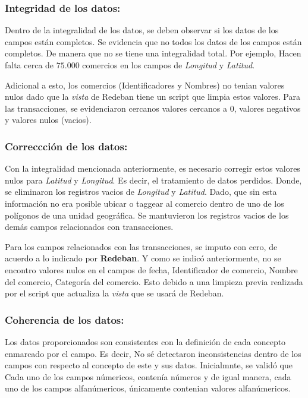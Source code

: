 \documentclass[a4paper]{article}
\begin{document}
\subsubsection*{Integridad de los datos:}

Dentro de la integralidad de los datos, se deben observar si los datos de los campos
están completos. Se evidencia que no todos los datos de los campos están completos.
De manera que no se tiene una integralidad total. Por ejemplo, Hacen falta cerca de $75.000$ comercios en los campos de \textit{Longitud} y \textit{Latitud}.

Adicional a esto, los comercios (Identificadores y Nombres) no tenian valores nulos
dado que la \textit{vista} de Redeban tiene un script que limpia estos valores. Para las transacciones,
se evidenciaron cercanos valores cercanos a 0, valores negativos y valores nulos (vacios).

\subsubsection*{Correccción de los datos:}

Con la integralidad mencionada anteriormente, es necesario corregir estos valores nulos para \textit{Latitud} y \textit{Longitud}.
Es decir, el tratamiento de datos perdidos. Donde, se eliminaron los registros vacios de \textit{Longitud} y \textit{Latitud}.
Dado, que sin esta información no era posible ubicar o taggear al comercio dentro de uno de los polígonos de una unidad geográfica. Se mantuvieron los registros
vacios de los demás campos relacionados con transacciones.

Para los campos relacionados con las transacciones, se imputo con cero, de acuerdo a lo indicado por \textbf{Redeban}.
Y como se indicó anteriormente, no se encontro valores nulos en el campos de fecha, Identificador de comercio, Nombre del comercio, Categoría del comercio. Esto debido a
una limpieza previa realizada por el script que actualiza la \textit{vista} que se usará de Redeban.

\subsubsection*{Coherencia de los datos:}

Los datos proporcionados son consistentes con la definición de cada concepto enmarcado por el campo. Es decir,
No sé detectaron inconsistencias dentro de los campos con respecto al concepto de este y sus datos. Inicialmnte, se validó que Cada uno de los campos númericos, contenía números y de igual manera,
cada uno de los campos alfanúmericos, únicamente contenian valores alfanúmericos.
\end{document}
